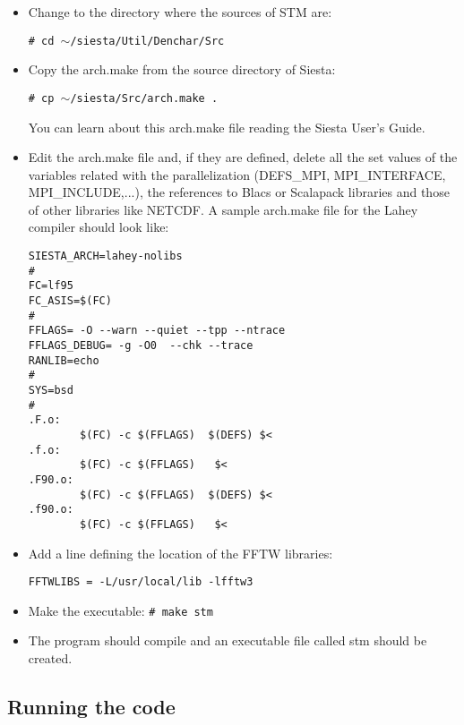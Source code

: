   \begin{itemize}

   \item Change to the directory where the sources of {\sc STM} are:

         {\tt \# cd $\sim$/siesta/Util/Denchar/Src}

   \item Copy the arch.make from the source directory of {\sc Siesta}:

         {\tt \# cp $\sim$/siesta/Src/arch.make .}

         You can learn about this arch.make file reading the 
         {\sc Siesta} User's Guide.

   \item Edit the arch.make file and, if they are defined,
         delete all the set values
         of the variables related with the parallelization
         (DEFS\_MPI, MPI\_INTERFACE, MPI\_INCLUDE,...),   
         the references to Blacs or Scalapack libraries
         and those of other libraries like NETCDF.
         A sample arch.make file for the Lahey compiler
         should look like:

\begin{verbatim}
SIESTA_ARCH=lahey-nolibs
#
FC=lf95
FC_ASIS=$(FC)
#
FFLAGS= -O --warn --quiet --tpp --ntrace
FFLAGS_DEBUG= -g -O0  --chk --trace
RANLIB=echo
#
SYS=bsd
#
.F.o:
        $(FC) -c $(FFLAGS)  $(DEFS) $<
.f.o:
        $(FC) -c $(FFLAGS)   $<
.F90.o:
        $(FC) -c $(FFLAGS)  $(DEFS) $<
.f90.o:
        $(FC) -c $(FFLAGS)   $<
\end{verbatim}


  \item Add a line defining the location of the FFTW libraries:

\begin{verbatim}
FFTWLIBS = -L/usr/local/lib -lfftw3
\end{verbatim}

   \item Make the executable:
         {\tt \# make stm}

   \item The program should compile and an executable file called
         stm should be created.

  \end{itemize}

\subsection{Running the code}

